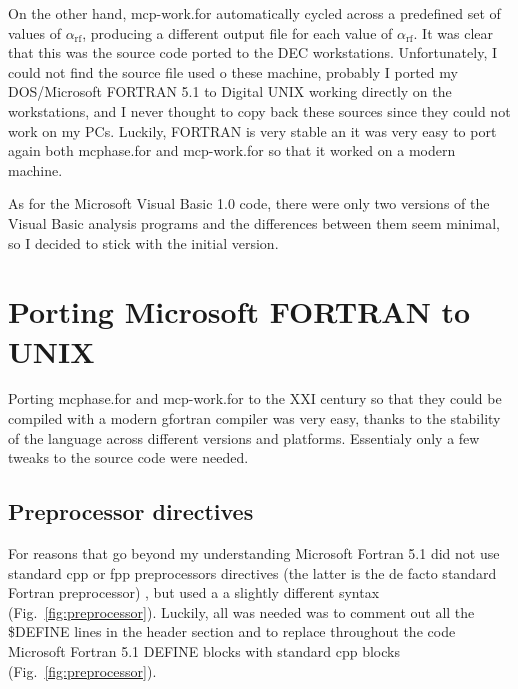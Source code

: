 On the other hand, \textsf{mcp-work.for} automatically cycled across a predefined set of values of $\alpha_\mathrm{rf}$, producing a different output file for each value of $\alpha_\mathrm{rf}$. It was clear that this was the source code ported to the DEC workstations. 
Unfortunately, I could not find the source file used o these machine, probably I ported my DOS/Microsoft FORTRAN 5.1 to Digital UNIX working directly on the workstations, and I never thought to copy back these sources since they could not work on my PCs.
Luckily, FORTRAN is very stable an it was very easy to port again both \textsf{mcphase.for} and \textsf{mcp-work.for} so that it worked on a modern machine.

As for the Microsoft Visual Basic 1.0 code, there were only two versions of the Visual Basic analysis programs and the differences between them seem minimal, so I decided to stick with the initial version.


\section{Porting Microsoft FORTRAN to UNIX}

Porting \textsf{mcphase.for} and \textsf{mcp-work.for} to the XXI century so that they could be compiled with a modern \textsf{gfortran} compiler was very easy, thanks to the stability of the language across different versions and platforms. Essentialy only a few tweaks to the source code were needed.


\subsection{Preprocessor directives}

For reasons that go beyond my understanding Microsoft Fortran 5.1 did not use standard \textsf{cpp} or \textsf{fpp} preprocessors directives (the latter is the de facto standard Fortran preprocessor) \cite{Boyanski:1992}, but used a a slightly different syntax (Fig.~\ref{fig:preprocessor}). Luckily, all was needed was to comment out all the \textsf{\$DEFINE} lines in the header section and to replace throughout the code Microsoft Fortran 5.1 \textsf{DEFINE} blocks with standard \textsf{cpp} blocks (Fig.~\ref{fig:preprocessor}). 



